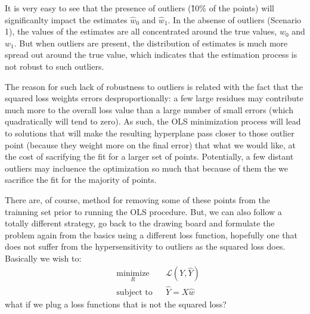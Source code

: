 It is very easy to see that the presence of outliers (\~ 10\% of the points) will significanlty impact the estimates $\hat{w}_0$ and $\hat{w}_1$. In the absense of outliers (Scenario 1), the values of the estimates are all concentrated around the true values, $w_0$ and $w_1$. But when outliers are present, the distribution of estimates is much more spread out around the true value, which indicates that the estimation process is not robust to such outliers.

The reason for such lack of robustness to outliers is related with the fact that the squared loss weights errors desproportionally: a few large residues may contribute much more to the overall loss value than a large number of small errors (which quadratically will tend to zero). As such, the OLS minimization process will lead to solutions that will make the resulting hyperplane pass closer to those outlier point (because they weight more on the final error) that what we would like, at the cost of sacrifying the fit for a larger set of points. Potentially, a few distant outliers may incluence the optimization so much that because of them the we sacrifice the fit for the majority of points.

There are, of course, method for removing some of these points from the trainning set prior to running the OLS procedure. But, we can also follow a totally different strategy, go back to the drawing board and formulate the problem again from the basics using a different loss function, hopefully one that does not suffer from the hypersensitivity to outliers as the squared loss does. Basically we wish to: 
\begin{equation}
\begin{aligned}
& \underset{R}{\text{minimize}} & & \mathcal{L}(Y, \hat{Y}) \\
& \text{subject to} & & \hat{Y} = X \hat{w}  
\label{eq.fundamental_minimization_problem}
\end{aligned}
\end{equation}
what if we plug a loss functions that is not the squared loss? 

